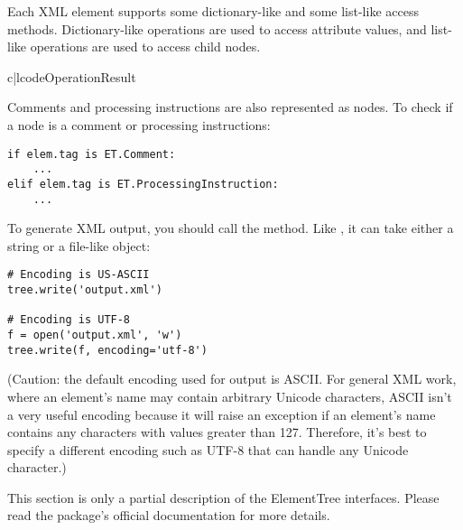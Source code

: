 \documentclass{howto}
\begin{document}
Each XML element supports some dictionary-like and some list-like
access methods.  Dictionary-like operations are used to access attribute
values, and list-like operations are used to access child nodes.

\begin{tableii}{c|l}{code}{Operation}{Result}
\end{tableii}

Comments and processing instructions are also represented as
 nodes.  To check if a node is a comment or processing
instructions:

\begin{verbatim}
if elem.tag is ET.Comment:
    ...
elif elem.tag is ET.ProcessingInstruction:
    ...
\end{verbatim}

To generate XML output, you should call the
 method.  Like ,
it can take either a string or a file-like object:

\begin{verbatim}
# Encoding is US-ASCII
tree.write('output.xml')

# Encoding is UTF-8
f = open('output.xml', 'w')
tree.write(f, encoding='utf-8')
\end{verbatim}

(Caution: the default encoding used for output is ASCII.  For general
XML work, where an element's name may contain arbitrary Unicode
characters, ASCII isn't a very useful encoding because it will raise
an exception if an element's name contains any characters with values
greater than 127.  Therefore, it's best to specify a different
encoding such as UTF-8 that can handle any Unicode character.)

This section is only a partial description of the ElementTree interfaces.
Please read the package's official documentation for more details.
\end{document}
